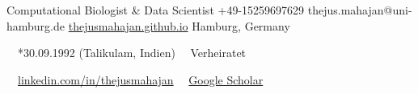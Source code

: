 \documentclass{thejus_cv}
\begin{document}
         {Computational Biologist \& Data Scientist}
         {+49-15259697629}
         {thejus.mahajan@uni-hamburg.de}
         {\href{https://thejusmahajan.github.io}{thejusmahajan.github.io}}
         {Hamburg, Germany}

\vspace{-0.5cm}
{\small\color{white}
\faCalendar\ \ *30.09.1992 (Talikulam, Indien) \hspace{0.5cm} \faUser\ \ Verheiratet
}\par
\vspace{0.1cm}
{\small\color{white}
\faLinkedin\ \ \href{https://www.linkedin.com/in/thejusmahajan/}{linkedin.com/in/thejusmahajan}
\hspace{0.5cm}
\faGraduationCap\ \ \href{https://scholar.google.com/citations?user=PJkZwAwAAAAJ}{Google Scholar}
}\par
\vspace{0.1cm}
\end{document}

